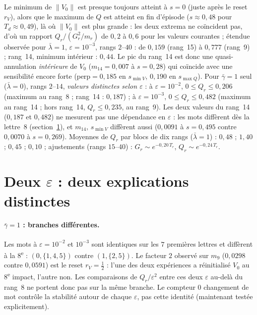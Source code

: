 \documentclass[11pt,a4paper]{article}
\theoremstyle{remark}
\newcommand{\norm}[1]{\lVert #1\rVert}
\begin{document}
Le minimum de $\norm{V_0}$ est presque toujours atteint \`a $s=0$ (juste apr\`es le reset $r_V$), alors que le maximum de $Q$ est atteint en fin d'\'episode ($s\approx0{,}48$ pour $T_d\approx0{,}49$), l\`a o\`u $\norm{V_0}$ est plus grande : les deux extrema ne coïncident pas, d'o\`u un rapport $Q_r/(G_r^2/m_r)$ de $0{,}2$ \`a $0{,}6$ pour les valeurs courantes ; \'etendue observ\'ee pour $\bar\lambda=1$, $\varepsilon=10^{-3}$, rangs $2$--$40$ : de $0{,}159$ (rang~15) \`a $0{,}777$ (rang~9) ; rang~14, minimum int\'erieur : $0{,}44$. Le pic du rang~14 est donc une quasi-annulation \emph{int\'erieure} de $V_0$ ($m_{14}=0{,}007$ \`a $s=0{,}28$) qui coïncide avec une sensibilit\'e encore forte ($\mathrm{perp}=0{,}185$ en $s_{\min V}$, $0{,}190$ en $s_{\max Q}$). Pour $\bar\gamma=1$ seul ($\bar\lambda=0$), rangs $2$--$14$, \emph{valeurs distinctes selon $\varepsilon$} : \`a $\varepsilon=10^{-2}$, $0\le Q_r\le0{,}206$ (maximum au rang~8 ; rang~14 : $0{,}187$) ; \`a $\varepsilon=10^{-3}$, $0\le Q_r\le0{,}482$ (maximum au rang~14 ; hors rang~14, $Q_r\le0{,}235$, au rang~9). Les deux valeurs du rang~14 ($0{,}187$ et $0{,}482$) ne mesurent pas une d\'ependance en $\varepsilon$ : les mots diff\`erent d\`es la lettre~8 (section~\ref{sec:eps}), et $m_{14}$, $s_{\min V}$ diff\`erent aussi ($0{,}0091$ \`a $s=0{,}495$ contre $0{,}0070$ \`a $s=0{,}269$). Moyennes de $Q_r$ par blocs de dix rangs ($\bar\lambda=1$) : $0{,}48$ ; $1{,}40$ ; $0{,}45$ ; $0{,}10$ ; ajustements (rangs $15$--$40$) : $G_r\sim e^{-0{,}20\,T_r}$, $Q_r\sim e^{-0{,}24\,T_r}$.

\section{Deux $\varepsilon$ : deux explications distinctes}\label{sec:eps}
\paragraph{$\bar\gamma=1$ : branches diff\'erentes.} Les mots \`a $\varepsilon=10^{-2}$ et $10^{-3}$ sont identiques sur les $7$ premi\`eres lettres et diff\`erent \`a la $8$\textsuperscript{e} : $(0,\{1,4,5\})$ contre $(1,\{2,5\})$. Le facteur $2$ observ\'e sur $m_9$ ($0{,}0298$ contre $0{,}0591$) est le reset $r_V=\frac12$ : l'une des deux exp\'eriences a r\'einitialis\'e $V_0$ au 8\textsuperscript{e} impact, l'autre non. Les comparaisons de $Q_r/\varepsilon^2$ entre ces deux $\varepsilon$ au-del\`a du rang~8 ne portent donc pas sur la m\^eme branche. Le compteur \og $0$ changement de mot \fg{} contr\^ole la stabilit\'e autour de chaque $\varepsilon$, pas cette identit\'e (maintenant test\'ee explicitement).
\end{document}
